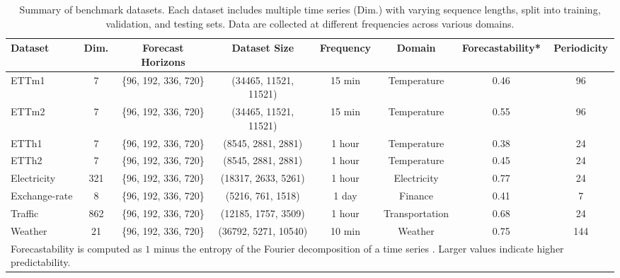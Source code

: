 \begin{table}[!htbp]
  \caption{Summary of benchmark datasets. Each dataset includes multiple time series (Dim.) with varying sequence lengths, split into training, validation, and testing sets. Data are collected at different frequencies across various domains.}
  \vspace{-0.5em}
  \label{tab:dataset}
  \centering
  \begin{tabular}{l|c|c|c|c|c|c|c}
    \toprule
    Dataset & Dim. & Forecast Horizons & Dataset Size & Frequency & Domain & Forecastability* & Periodicity \\
    \toprule
    ETTm1 & 7 & {\{96, 192, 336, 720\}} & (34465, 11521, 11521) & 15 min & Temperature & 0.46 & 96 \\
    \cmidrule{1-8}
    ETTm2 & 7 & {\{96, 192, 336, 720\}} & (34465, 11521, 11521) & 15 min & Temperature & 0.55 & 96 \\
    \cmidrule{1-8}
    ETTh1 & 7 & {\{96, 192, 336, 720\}} & (8545, 2881, 2881) & 1 hour & Temperature & 0.38 & 24 \\
    \cmidrule{1-8}
    ETTh2 & 7 & {\{96, 192, 336, 720\}} & (8545, 2881, 2881) & 1 hour & Temperature & 0.45 & 24 \\
    \cmidrule{1-8}
    Electricity & 321 & {\{96, 192, 336, 720\}} & (18317, 2633, 5261) & 1 hour & Electricity & 0.77 & 24 \\
    \cmidrule{1-8}
    Exchange-rate & 8 & {\{96, 192, 336, 720\}} & (5216, 761, 1518) & 1 day & Finance & 0.41 & 7 \\
    \cmidrule{1-8}
    Traffic & 862 & {\{96, 192, 336, 720\}} & (12185, 1757, 3509) & 1 hour & Transportation & 0.68 & 24 \\
    \cmidrule{1-8}
    Weather & 21 & {\{96, 192, 336, 720\}} & (36792, 5271, 10540) & 10 min & Weather & 0.75 & 144 \\
    \bottomrule
    \multicolumn{8}{l}{\scriptsize* Forecastability is computed as $1$ minus the entropy of the Fourier decomposition of a time series \cite{goerg2013forecastable}. Larger values indicate higher predictability.} \\
    
  \end{tabular}
    \vspace{-0.5em}
\end{table}